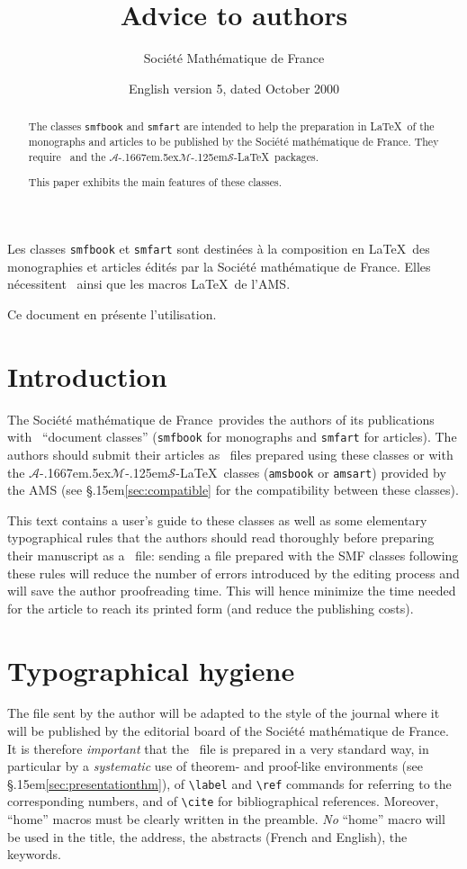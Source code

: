 \documentclass[11pt,english]{smfart}
\title{Advice to authors}
\date {English version 5, dated October 2000}
\author{Soci\'et\'e Ma\-th\'e\-ma\-ti\-que de France}
\newcommand{\SmF}{Soci\'et\'e ma\-th\'e\-ma\-ti\-que de France}
\newcommand{\T}{\S\kern .15em\relax }
\newcommand{\AMS}{$\mathcal{A}$\kern-.1667em\lower.5ex\hbox
        {$\mathcal{M}$}\kern-.125em$\mathcal{S}$}
\begin{document}
\def\smfbyname{}

\begin{abstract}
The classes \texttt{smfbook} and \texttt{smfart} are intended to help the preparation in \LaTeX\ of the monographs and articles to be published by the \SmF. They require \LaTeXe\ and the \AMS-\LaTeX\ packages.\par
This paper exhibits the main features of these classes.
\end{abstract}

\begin{altabstract}
Les classes \texttt{smfbook} et \texttt{smfart} sont destin\'ees \`a la composition en \LaTeX\ des monographies et articles \'edit\'es par la \SmF. Elles n\'ecessitent \LaTeXe\ ainsi que les macros \LaTeX\ de l'AMS.\par
Ce document en pr\'esente l'utilisation.
\end{altabstract}
\maketitle

\tableofcontents

\section{Introduction}
The \SmF\ provides the authors of its publications with \LaTeXe\ ``document classes'' (\texttt{smfbook} for monographs and \texttt{smfart} for articles). The authors should submit their articles as \LaTeXe\ files prepared using these classes or with the \AMS-\LaTeX\ classes (\texttt{amsbook} or \texttt{amsart}) provided by the AMS (see \T\ref{sec:compatible} for the compatibility between these classes).

This text contains a user's guide to these classes as well as some elementary typographical rules that the authors should read thoroughly before preparing their manuscript as a \LaTeXe\ file: sending a file prepared with the SMF classes following these rules will reduce the number of errors introduced by the editing process and will save the author proofreading time. This will hence minimize the time needed for the article to reach its printed form (and reduce the publishing costs).


\section{Typographical hygiene}
The file sent by the author will be adapted to the style of the journal where it will be published by the editorial board of the \SmF. It is therefore {\em important} that the \LaTeXe\ file is prepared in a very standard way, in particular by a {\em systematic} use of theorem- and proof-like environments (see \T\ref{sec:presentationthm}), of \verb|\label| and \verb|\ref| commands for referring to the corresponding numbers, and of \verb|\cite| for bibliographical references. Moreover, ``home'' macros must be clearly written in the preamble. {\em No} ``home'' macro will be used in the title, the address, the abstracts (French and English), the keywords.
\end{document}
